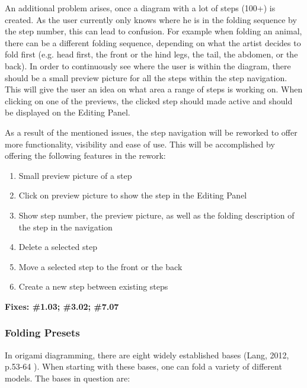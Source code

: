An additional problem arises, once a diagram with a lot of steps (100+) is created. As the user currently only knows where he is in the folding sequence by the step number, this can lead to confusion. For example when folding an animal, there can be a different folding sequence, depending on what the artist decides to fold first (e.g. head first, the front or the hind legs, the tail, the abdomen, or the back). In order to continuously see where the user is within the diagram, there should be a small preview picture for all the steps within the step navigation. This will give the user an idea on what area a range of steps is working on. When clicking on one of the previews, the clicked step should made active and should be displayed on the Editing Panel.

As a result of the mentioned issues, the step navigation will be reworked to offer more functionality, visibility and ease of use. This will be accomplished by offering the following features in the rework:

\begin{enumerate}
\item Small preview picture of a step
\item Click on preview picture to show the step in the Editing Panel
\item Show step number, the preview picture, as well as the folding description of the step in the navigation
\item Delete a selected step
\item Move a selected step to the front or the back
\item Create a new step between existing steps
\end{enumerate}

\textbf{Fixes: \#1.03; \#3.02;   \#7.07}

\subsubsection{Folding Presets}
In origami diagramming, there are eight widely established bases (Lang, 2012, p.53-64 \cite{DesignSecrets}). When starting with these bases, one can fold a variety of different models. The bases in question are:
\newpage
 
